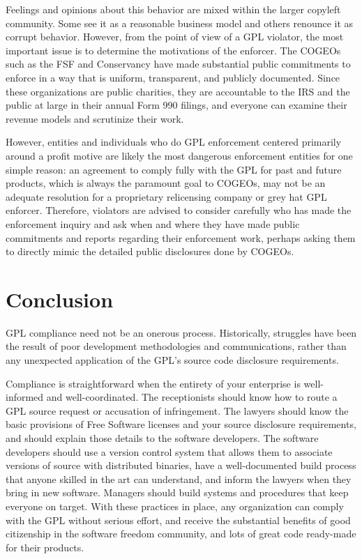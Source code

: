 Feelings and opinions about this behavior are mixed within the larger
copyleft community.  Some see it as a reasonable business model and others
renounce it as corrupt behavior.  However, from the point of view of a GPL
violator, the most important issue is to determine the motivations of the
enforcer.  The COGEOs such as the FSF and Conservancy have made substantial
public commitments to enforce in a way that is uniform, transparent, and
publicly documented.  Since these organizations are public charities, they
are accountable to the IRS and the public at large in their annual Form 990
filings, and everyone can examine their revenue models and scrutinize their
work.

However, entities and individuals who do GPL enforcement centered primarily
around a profit motive are likely the most dangerous enforcement entities for
one simple reason: an agreement to comply fully with the GPL for past and
future products, which is always the paramount goal to COGEOs, may not be an
adequate resolution for a proprietary relicensing company or grey hat GPL
enforcer.  Therefore, violators are advised to consider carefully who has
made the enforcement inquiry and ask when and where they have made public
commitments and reports regarding their enforcement work, perhaps asking them
to directly mimic the detailed public disclosures done by COGEOs.

\chapter{Conclusion}

GPL compliance need not be an onerous process.  Historically, struggles
have been the result of poor development methodologies and communications,
rather than any unexpected application of the GPL's source code disclosure
requirements.

Compliance is straightforward when the entirety of your enterprise is
well-informed and well-coordinated.  The receptionists should know how to
route a GPL source request or accusation of infringement.  The lawyers
should know the basic provisions of Free Software licenses and your source
disclosure requirements, and should explain those details to the software
developers.  The software developers should use a version control system
that allows them to associate versions of source with distributed
binaries, have a well-documented build process that anyone skilled in the
art can understand, and inform the lawyers when they bring in new
software.  Managers should build systems and procedures that keep everyone
on target.  With these practices in place, any organization can comply
with the GPL without serious effort, and receive the substantial benefits
of good citizenship in the software freedom community, and lots of great code
ready-made for their products.

\vfill

